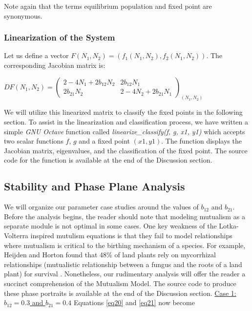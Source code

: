 \documentclass[11pt,a4paper]{scrartcl}
\theoremstyle{definition}
\begin{document}
Note again that the terms equilibrium population and fixed point are synonymous.

\subsubsection{Linearization of the System}

Let us define a vector $F(N_1,N_2)=(f_1(N_1, N_2), f_2(N_1, N_2))$. The corresponding Jacobian matrix is: 

\begin{center}
$DF(N_1,N_2)=\begin{pmatrix}
	2-4N_1+2b_{12}N_2 & 2b_{12}N_1 \\
	2b_{21}N_2 & {2-4N_2+2b_{21}N_1}
\end{pmatrix}_{(N_1,N_2)}$
\end{center}

We will utilize this linearized matrix to classify the fixed points in the following section. To assist in the linearization and classification process, we have written a simple \textit{GNU Octave} function called\textit{ linearize\_classify(f, g, x1, y1)} which accepts two scalar functions $f$, $g$ and a fixed point $(x1,y1)$. The function displays the Jacobian matrix, eigenvalues, and the classification of the fixed point. The source code for the function is available at the end of the Discussion section. 

\subsection{Stability and Phase Plane Analysis}

We will organize our parameter case studies around the values of $b_{12}$ and $b_{21}$. Before the analysis begins, the reader should note that modeling mutualism as a separate module is not optimal in some cases. One key weakness of the Lotka-Volterra inspired mutulism equations is that they fail to model relationships where mutualism is critical to the birthing mechanism of a species. For example, Heijden and Horton found that 48\% of land plants rely on mycorrhizal relationships (mutualistic relationship between a fungus and the roots of a land plant) for survival \cite{Van}. Nonetheless, our rudimentary analysis will offer the reader a succinct comprehension of the Mutualism Model. The source code to produce these phase portraits is available at the end of the Discussion section.
\newline\newline
\underline{Case 1: $b_{12} = 0.3$ and $b_{21} = 0.4$}
\newline\newline
Equations \eqref{eq20} and \eqref{eq21} now become 
\end{document}
